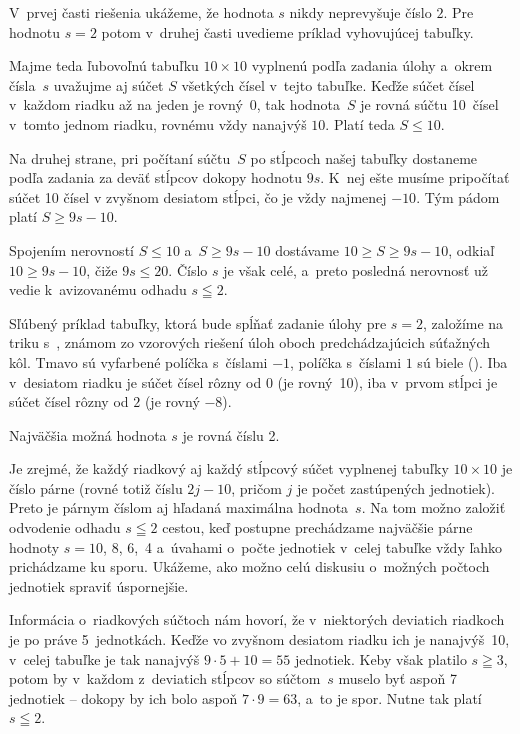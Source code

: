 {%
V~prvej časti riešenia ukážeme, že hodnota $s$ nikdy
neprevyšuje číslo $2$. Pre hodnotu $s=2$ potom v~druhej časti uvedieme
príklad vyhovujúcej tabuľky.

\smallskip
Majme teda ľubovoľnú tabuľku $10\times10$ vyplnenú podľa zadania úlohy
a~okrem čísla~$s$ uvažujme aj súčet $S$ všetkých čísel v~tejto tabuľke.
Keďže súčet čísel v~každom riadku až na jeden je rovný~0, tak hodnota~$S$
je rovná súčtu 10~čísel v~tomto jednom riadku, rovnému vždy nanajvýš $10$.
Platí teda $S\leq10$.

Na druhej strane, pri počítaní súčtu~$S$ po stĺpcoch našej tabuľky
dostaneme podľa zadania za deväť stĺpcov dokopy hodnotu $9s$.
K~nej ešte musíme pripočítať súčet 10 čísel v zvyšnom desiatom stĺpci,
čo je vždy najmenej ${-10}$. Tým pádom platí $S\geq 9s-10$.

Spojením nerovností $S\le10$ a~$S\ge9s-10$ dostávame
$10\geq S\geq9s-10$, odkiaľ $10 \ge 9s-10$, čiže $9s\leq20$.
Číslo $s$ je však celé, a~preto posledná nerovnosť už vedie
k~avizovanému odhadu $s\leqq2$.

\smallskip
Sľúbený príklad tabuľky, ktorá bude spĺňať zadanie úlohy pre
$s=2$, založíme na triku s~, známom zo
vzorových riešení úloh oboch predchádzajúcich súťažných kôl. Tmavo
sú vyfarbené políčka s~číslami ${-1}$, políčka s~číslami $1$ sú
biele (\obr). Iba v~desiatom riadku je súčet čísel rôzny od 0 (je rovný~10),
iba v~prvom stĺpci je súčet čísel rôzny od $2$ (je rovný ${-8}$).
%

\zaver
Najväčšia možná hodnota $s$ je rovná číslu 2.

\poznamka
Je zrejmé, že každý riadkový aj každý stĺpcový súčet vyplnenej
tabuľky ${10\times10}$ je číslo párne
(rovné totiž číslu $2j-10$, pričom $j$ je počet zastúpených jednotiek). Preto je
párnym číslom aj hľadaná maximálna hodnota~$s$.
Na tom možno založiť odvodenie odhadu
$s\leqq2$ cestou, keď postupne prechádzame najväčšie párne hodnoty
$s=10$, 8, 6,~4 a~úvahami o~počte jednotiek v~celej tabuľke
vždy ľahko prichádzame ku sporu. Ukážeme, ako možno celú diskusiu
o~možných počtoch jednotiek spraviť úspornejšie.

Informácia o~riadkových súčtoch nám hovorí, že v~niektorých deviatich
riadkoch je po práve 5~jednotkách. Keďže vo zvyšnom desiatom riadku
ich je nanajvýš~10, v~celej tabuľke je tak
nanajvýš $9\cdot5+10=55$ jednotiek. Keby však platilo $s\geqq3$, potom by v~každom z~deviatich stĺpcov so súčtom~$s$ muselo byť aspoň 7 jednotiek -- dokopy by ich bolo aspoň $7\cdot9=63$,
a~to je spor. Nutne tak platí $s\leqq2$.


}
